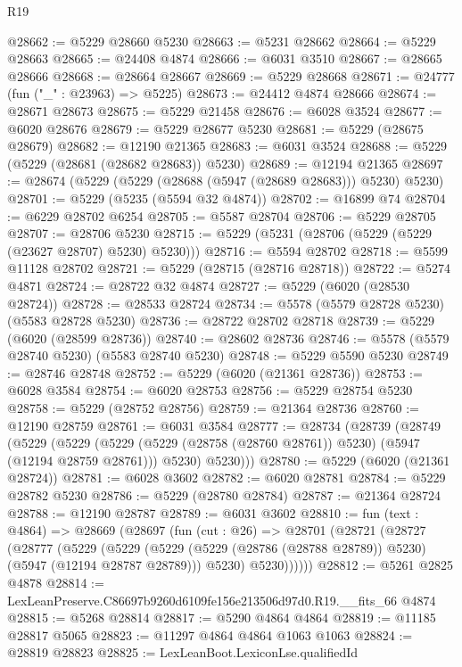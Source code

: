\begin{lexlean}{R19}
\begin{coremodule}
@28662 := @5229 @28660 @5230
@28663 := @5231 @28662
@28664 := @5229 @28663
@28665 := @24408 @4874
@28666 := @6031 @3510
@28667 := @28665 @28666
@28668 := @28664 @28667
@28669 := @5229 @28668
@28671 := @24777 (fun ("_" : @23963) => @5225)
@28673 := @24412 @4874 @28666
@28674 := @28671 @28673
@28675 := @5229 @21458
@28676 := @6028 @3524
@28677 := @6020 @28676
@28679 := @5229 @28677 @5230
@28681 := @5229 (@28675 @28679)
@28682 := @12190 @21365
@28683 := @6031 @3524
@28688 := @5229 (@5229 (@28681 (@28682 @28683)) @5230)
@28689 := @12194 @21365
@28697 := @28674 (@5229 (@5229 (@28688 (@5947 (@28689 @28683))) @5230) @5230)
@28701 := @5229 (@5235 (@5594 @32 @4874))
@28702 := @16899 @74
@28704 := @6229 @28702 @6254
@28705 := @5587 @28704
@28706 := @5229 @28705
@28707 := @28706 @5230
@28715 := @5229 (@5231 (@28706 (@5229 (@5229 (@23627 @28707) @5230) @5230)))
@28716 := @5594 @28702
@28718 := @5599 @11128 @28702
@28721 := @5229 (@28715 (@28716 @28718))
@28722 := @5274 @4871
@28724 := @28722 @32 @4874
@28727 := @5229 (@6020 (@28530 @28724))
@28728 := @28533 @28724
@28734 := @5578 (@5579 @28728 @5230) (@5583 @28728 @5230)
@28736 := @28722 @28702 @28718
@28739 := @5229 (@6020 (@28599 @28736))
@28740 := @28602 @28736
@28746 := @5578 (@5579 @28740 @5230) (@5583 @28740 @5230)
@28748 := @5229 @5590 @5230
@28749 := @28746 @28748
@28752 := @5229 (@6020 (@21361 @28736))
@28753 := @6028 @3584
@28754 := @6020 @28753
@28756 := @5229 @28754 @5230
@28758 := @5229 (@28752 @28756)
@28759 := @21364 @28736
@28760 := @12190 @28759
@28761 := @6031 @3584
@28777 := @28734
    (@28739
      (@28749
        (@5229
          (@5229
            (@5229 (@5229 (@28758 (@28760 @28761)) @5230) (@5947 (@12194 @28759 @28761)))
            @5230)
          @5230)))
@28780 := @5229 (@6020 (@21361 @28724))
@28781 := @6028 @3602
@28782 := @6020 @28781
@28784 := @5229 @28782 @5230
@28786 := @5229 (@28780 @28784)
@28787 := @21364 @28724
@28788 := @12190 @28787
@28789 := @6031 @3602
@28810 := fun (text : @4864) =>
  @28669
    (@28697
      (fun (cut : @26) =>
      @28701
        (@28721
          (@28727
            (@28777
              (@5229
                (@5229
                  (@5229 (@5229 (@28786 (@28788 @28789)) @5230) (@5947 (@12194 @28787 @28789)))
                  @5230)
                @5230))))))
@28812 := @5261 @2825 @4878
@28814 := LexLeanPreserve.C86697b9260d6109fe156e213506d97d0.R19.__fits_66 @4874
@28815 := @5268 @28814
@28817 := @5290 @4864 @4864
@28819 := @11185 @28817 @5065
@28823 := @11297 @4864 @4864 @1063 @1063
@28824 := @28819 @28823
@28825 := LexLeanBoot.LexiconLse.qualifiedId

\end{coremodule}
\end{lexlean}
